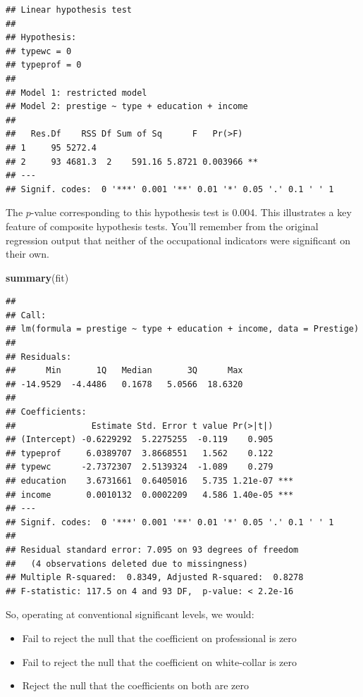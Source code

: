 \documentclass[
  12pt,
  oneside,openany]{book}
\newenvironment{Shaded}{\begin{snugshade}}{\end{snugshade}}
\newcommand{\KeywordTok}[1]{\textcolor[rgb]{0.13,0.29,0.53}{\textbf{#1}}}
\newcommand{\NormalTok}[1]{#1}
\providecommand{\tightlist}{%
  \setlength{\itemsep}{0pt}\setlength{\parskip}{0pt}}
\begin{document}
\begin{verbatim}
## Linear hypothesis test
## 
## Hypothesis:
## typewc = 0
## typeprof = 0
## 
## Model 1: restricted model
## Model 2: prestige ~ type + education + income
## 
##   Res.Df    RSS Df Sum of Sq      F   Pr(>F)   
## 1     95 5272.4                                
## 2     93 4681.3  2    591.16 5.8721 0.003966 **
## ---
## Signif. codes:  0 '***' 0.001 '**' 0.01 '*' 0.05 '.' 0.1 ' ' 1
\end{verbatim}

The \(p\)-value corresponding to this hypothesis test is 0.004. This illustrates a key feature of composite hypothesis tests. You'll remember from the original regression output that neither of the occupational indicators were significant on their own.

\begin{Shaded}
\begin{Highlighting}[]
\KeywordTok{summary}\NormalTok{(fit)}
\end{Highlighting}
\end{Shaded}

\begin{verbatim}
## 
## Call:
## lm(formula = prestige ~ type + education + income, data = Prestige)
## 
## Residuals:
##      Min       1Q   Median       3Q      Max 
## -14.9529  -4.4486   0.1678   5.0566  18.6320 
## 
## Coefficients:
##               Estimate Std. Error t value Pr(>|t|)    
## (Intercept) -0.6229292  5.2275255  -0.119    0.905    
## typeprof     6.0389707  3.8668551   1.562    0.122    
## typewc      -2.7372307  2.5139324  -1.089    0.279    
## education    3.6731661  0.6405016   5.735 1.21e-07 ***
## income       0.0010132  0.0002209   4.586 1.40e-05 ***
## ---
## Signif. codes:  0 '***' 0.001 '**' 0.01 '*' 0.05 '.' 0.1 ' ' 1
## 
## Residual standard error: 7.095 on 93 degrees of freedom
##   (4 observations deleted due to missingness)
## Multiple R-squared:  0.8349, Adjusted R-squared:  0.8278 
## F-statistic: 117.5 on 4 and 93 DF,  p-value: < 2.2e-16
\end{verbatim}

So, operating at conventional significant levels, we would:

\begin{itemize}
\tightlist
\item
  Fail to reject the null that the coefficient on professional is zero
\item
  Fail to reject the null that the coefficient on white-collar is zero
\item
  Reject the null that the coefficients on both are zero
\end{itemize}
\end{document}
